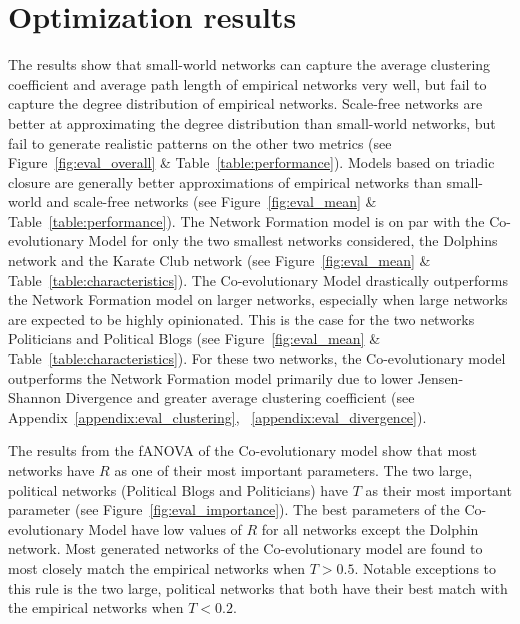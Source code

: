 \documentclass[11pt]{article}
\begin{document}
\section{Optimization results}

The results show that small-world networks can capture the average clustering coefficient and average path length of empirical networks very well, but fail to capture the degree distribution of empirical networks. Scale-free networks are better at approximating the degree distribution than small-world networks, but fail to generate realistic patterns on the other two metrics (see Figure~\ref{fig:eval_overall} \& Table~\ref{table:performance}). Models based on triadic closure are generally better approximations of empirical networks than small-world and scale-free networks (see Figure~\ref{fig:eval_mean} \& Table~\ref{table:performance}). The Network Formation model is on par with the Co-evolutionary Model for only the two smallest networks considered, the Dolphins network and the Karate Club network (see Figure~\ref{fig:eval_mean} \& Table~\ref{table:characteristics}). The Co-evolutionary Model drastically outperforms the Network Formation model on larger networks, especially when large networks are expected to be highly opinionated. This is the case for the two networks Politicians and Political Blogs (see Figure~\ref{fig:eval_mean} \& Table~\ref{table:characteristics}). For these two networks, the Co-evolutionary model outperforms the Network Formation model primarily due to lower Jensen-Shannon Divergence and greater average clustering coefficient (see Appendix~\ref{appendix:eval_clustering}, ~\ref{appendix:eval_divergence}).  

\noindent The results from the fANOVA of the Co-evolutionary model show that most networks have $R$ as one of their most important parameters. The two large, political networks (Political Blogs and Politicians) have $T$ as their most important parameter (see Figure~\ref{fig:eval_importance}).
The best parameters of the Co-evolutionary Model have low values of $R$ for all networks except the Dolphin network. Most generated networks of the Co-evolutionary model are found to most closely match the empirical networks when $T > 0.5$. Notable exceptions to this rule is the two large, political networks that both have their best match with the empirical networks when $T < 0.2$. 
\end{document}

